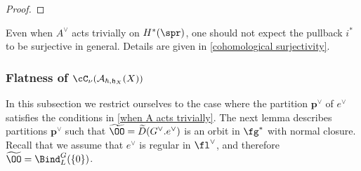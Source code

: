 \documentclass[12pt]{amsart}
\begin{document}
\begin{proof}


\end{proof}
\begin{rmk} \label{trivial action does not mean surj} %
    Even when $A^\vee$ acts trivially on $H^*(\spr)$, one should not expect the pullback $i^*$ to be surjective in general. Details are given in \cref{cohomological surjectivity}.
\end{rmk}

\subsubsection{Flatness of $\cC_\nu(\mathcal{A}_{\hbar,\mathfrak{h}_X}(X))$}
In this subsection we restrict ourselves to the case where the partition $\mathbf{p}^\vee$ of $e^\vee$ satisfies the conditions in \cref{when A acts trivially}. The next lemma describes partitions $\mathbf{p}^\vee$ such that $\widetilde{\OO}=\widetilde{D}(G^\vee.e^\vee)$ is an orbit in $\fg^*$ with normal closure. Recall that we assume that $e^\vee$ is regular in $\fl^\vee$, and therefore $\widetilde{\OO}= \Bind_L^{G}(\{0\})$.
\end{document}
